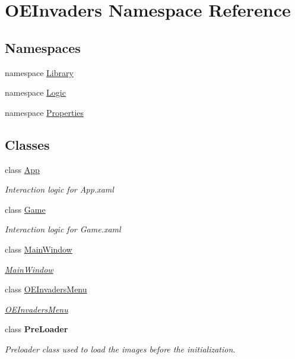 \hypertarget{namespace_o_e_invaders}{}\section{O\+E\+Invaders Namespace Reference}
\label{namespace_o_e_invaders}
\subsection*{Namespaces}
\begin{DoxyCompactItemize}
\item 
namespace \mbox{\hyperlink{namespace_o_e_invaders_1_1_library}{Library}}
\item 
namespace \mbox{\hyperlink{namespace_o_e_invaders_1_1_logic}{Logic}}
\item 
namespace \mbox{\hyperlink{namespace_o_e_invaders_1_1_properties}{Properties}}
\end{DoxyCompactItemize}
\subsection*{Classes}
\begin{DoxyCompactItemize}
\item 
class \mbox{\hyperlink{class_o_e_invaders_1_1_app}{App}}
\begin{DoxyCompactList}\small\item\em Interaction logic for App.\+xaml \end{DoxyCompactList}\item 
class \mbox{\hyperlink{class_o_e_invaders_1_1_game}{Game}}
\begin{DoxyCompactList}\small\item\em Interaction logic for Game.\+xaml \end{DoxyCompactList}\item 
class \mbox{\hyperlink{class_o_e_invaders_1_1_main_window}{Main\+Window}}
\begin{DoxyCompactList}\small\item\em \mbox{\hyperlink{class_o_e_invaders_1_1_main_window}{Main\+Window}} \end{DoxyCompactList}\item 
class \mbox{\hyperlink{class_o_e_invaders_1_1_o_e_invaders_menu}{O\+E\+Invaders\+Menu}}
\begin{DoxyCompactList}\small\item\em \mbox{\hyperlink{class_o_e_invaders_1_1_o_e_invaders_menu}{O\+E\+Invaders\+Menu}} \end{DoxyCompactList}\item 
class {\bfseries Pre\+Loader}
\begin{DoxyCompactList}\small\item\em Preloader class used to load the images before the initialization. \end{DoxyCompactList}\end{DoxyCompactItemize}
